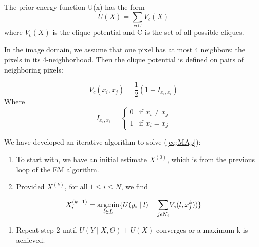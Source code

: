 The prior energy function U(x) has the form
\begin{equation}
U(X) = {\sum\limits_{c \epsilon C}}V_c(X)
\end{equation}
where $V_c(X)$ is the clique potential and C is the set of all
possible cliques.

In the image domain, we assume that one pixel has at most 4 neighbors: the pixels in its 4-neighborhood. Then the clique potential is defined on pairs of neighboring pixels:

\begin{equation}
V_c(x_i,x_j) = \frac{1}{2}(1-I_{x_i,x_i})
\end{equation}
Where
\begin{equation}
I_{x_i,x_i}=
\begin{cases} 
0 & \text{if } x_i\neq x_j \\
1      & \text{if } x_i= x_j 
\end{cases}
\end{equation}

We have developed an iterative algorithm to solve (\ref{eq:MAp}):


\begin{enumerate}
	\item To start with, we have an initial estimate \(X^(0)\), which is from the previous loop of the EM algorithm. 
	\item Provided \(X^{(k)}\), for all \(1\leq i \leq N\), we find
\end{enumerate}

\begin{equation}
X^{(k+1)}_i=\operatorname*{argmin}_{l \in L} \{U( y_i \mid l) + {\sum\limits_{j \epsilon N_i}}V_c(l,x^k_j))\}
\end{equation}

\begin{enumerate}
	\item Repeat step 2 until \(U( Y \mid X, \Theta) + U(X)\) converges or a maximum k is achieved.
\end{enumerate}


